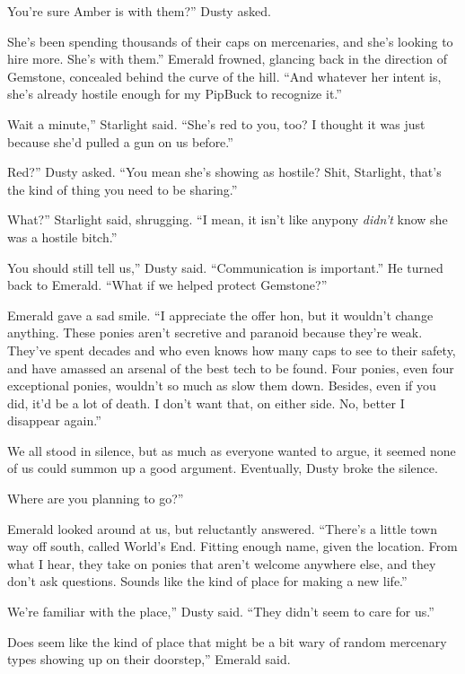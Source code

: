 \leavevmode{}You’re sure Amber is with them?” Dusty asked.

\leavevmode{}She’s been spending thousands of their caps on mercenaries, and she’s looking to hire more. She’s with them.” Emerald frowned, glancing back in the direction of Gemstone, concealed behind the curve of the hill. “And whatever her intent is, she’s already hostile enough for my PipBuck to recognize it.”

\leavevmode{}Wait a minute,” Starlight said. “She’s red to you, too? I thought it was just because she’d pulled a gun on us before.”

\leavevmode{}Red?” Dusty asked. “You mean she’s showing as hostile? Shit, Starlight, that’s the kind of thing you need to be sharing.”

\leavevmode{}What?” Starlight said, shrugging. “I mean, it isn’t like anypony \textit{didn’t} know she was a hostile bitch.”

\leavevmode{}You should still tell us,” Dusty said. “Communication is important.” He turned back to Emerald. “What if we helped protect Gemstone?”

Emerald gave a sad smile. “I appreciate the offer hon, but it wouldn’t change anything. These ponies aren’t secretive and paranoid because they’re weak. They’ve spent decades and who even knows how many caps to see to their safety, and have amassed an arsenal of the best tech to be found. Four ponies, even four exceptional ponies, wouldn’t so much as slow them down. Besides, even if you did, it’d be a lot of death. I don’t want that, on either side. No, better I disappear again.”

We all stood in silence, but as much as everyone wanted to argue, it seemed none of us could summon up a good argument. Eventually, Dusty broke the silence.

\leavevmode{}Where are you planning to go?”

Emerald looked around at us, but reluctantly answered. “There’s a little town way off south, called World’s End. Fitting enough name, given the location. From what I hear, they take on ponies that aren’t welcome anywhere else, and they don’t ask questions. Sounds like the kind of place for making a new life.”

\leavevmode{}We’re familiar with the place,” Dusty said. “They didn’t seem to care for us.”

\leavevmode{}Does seem like the kind of place that might be a bit wary of random mercenary types showing up on their doorstep,” Emerald said.

